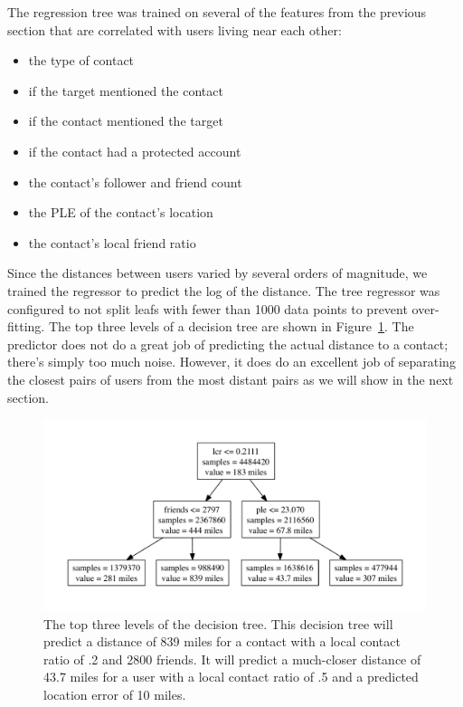 \documentclass[letterpaper]{article}
\begin{document}
The regression tree was trained on several of the features from the previous
section that are correlated with users living near each other:
\begin{itemize}
\item the type of contact
\item if the target mentioned the contact
\item if the contact mentioned the target
\item if the contact had a protected account
\item the contact's follower and friend count
\item the PLE of the contact's location
\item the contact's local friend ratio
\end{itemize}
%
Since the distances between users varied by several orders of magnitude, we
trained the regressor to predict the log of the distance.
%
The tree regressor was configured to not split leafs with fewer than 1000 data
points to prevent over-fitting.
%
The top three levels of a decision tree are shown in Figure~\ref{fig:TreeTop}.
%
The predictor does not do a great job of predicting the actual distance to a
contact; there's simply too much noise.
%
However, it does do an excellent job of separating the closest pairs of users
from the most distant pairs as we will show in the next section.

\begin{figure}[tbh]
\centering
\includegraphics[width=\linewidth]{figures/tree_top.pdf}
\caption{
    The top three levels of the decision tree. This decision tree will predict a
    distance of 839 miles for a contact with a local contact ratio of .2 and
    2800 friends. It will predict a much-closer distance of 43.7 miles for a
    user with a local contact ratio of .5 and a predicted location error of 10
    miles.
}
\label{fig:TreeTop}
\end{figure}
\end{document}

